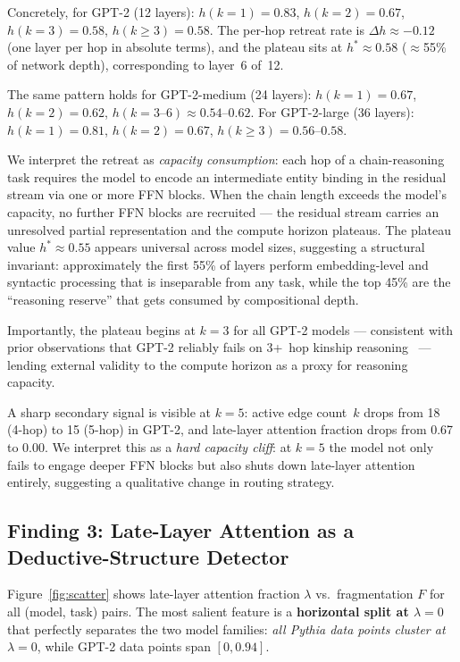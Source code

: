 \documentclass{article}
\begin{document}
Concretely, for GPT-2 (12 layers):
$h(k=1)=0.83$, $h(k=2)=0.67$, $h(k=3)=0.58$, $h(k\geq 3)=0.58$.
The per-hop retreat rate is $\Delta h \approx -0.12$ (one layer per hop
in absolute terms), and the plateau sits at $h^* \approx 0.58$
($\approx$55\% of network depth), corresponding to layer~6 of~12.

The same pattern holds for GPT-2-medium (24 layers):
$h(k=1)=0.67$, $h(k=2)=0.62$, $h(k=3\text{--}6)\approx0.54\text{--}0.62$.
For GPT-2-large (36 layers):
$h(k=1)=0.81$, $h(k=2)=0.67$, $h(k\geq3)=0.56\text{--}0.58$.

We interpret the retreat as \emph{capacity consumption}: each hop of
a chain-reasoning task requires the model to encode an intermediate
entity binding in the residual stream via one or more FFN blocks.
When the chain length exceeds the model's capacity, no further FFN
blocks are recruited — the residual stream carries an unresolved
partial representation and the compute horizon plateaus.
The plateau value $h^* \approx 0.55$ appears universal across model
sizes, suggesting a structural invariant: approximately the first 55\%
of layers perform embedding-level and syntactic processing that is
inseparable from any task, while the top 45\% are the ``reasoning
reserve'' that gets consumed by compositional depth.

Importantly, the plateau begins at $k=3$ for all GPT-2 models —
consistent with prior observations that GPT-2 reliably fails on 3+~hop
kinship reasoning~\citep{shi2023large} — lending external validity
to the compute horizon as a proxy for reasoning capacity.

A sharp secondary signal is visible at $k=5$: active edge count~$k$
drops from 18 (4-hop) to 15 (5-hop) in GPT-2, and late-layer attention
fraction drops from 0.67 to 0.00.
We interpret this as a \emph{hard capacity cliff}: at $k=5$ the model
not only fails to engage deeper FFN blocks but also shuts down
late-layer attention entirely, suggesting a qualitative change in
routing strategy.


\subsection{Finding 3: Late-Layer Attention as a Deductive-Structure Detector}

Figure~\ref{fig:scatter} shows late-layer attention fraction $\lambda$
vs.\ fragmentation $F$ for all (model, task) pairs.
The most salient feature is a \textbf{horizontal split at $\lambda = 0$}
that perfectly separates the two model families: \emph{all Pythia data
points cluster at $\lambda = 0$}, while GPT-2 data points span $[0, 0.94]$.
\end{document}
